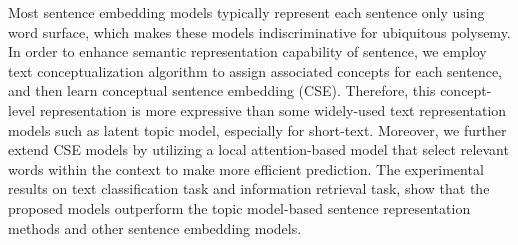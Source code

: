 Most sentence embedding models typically represent each sentence only using word surface, which makes these models indiscriminative for ubiquitous polysemy. In order to enhance semantic representation capability of sentence, we employ text conceptualization algorithm to assign associated concepts for each sentence, and then learn conceptual sentence embedding (CSE). Therefore, this concept-level representation is more expressive than some widely-used text representation models such as latent topic model, especially for short-text. Moreover, we further extend CSE models by utilizing a local attention-based model that select relevant words within the context to make more efficient prediction. The experimental results on text classification task and information retrieval task, show that the proposed models outperform the topic model-based sentence representation methods and other sentence embedding models.
